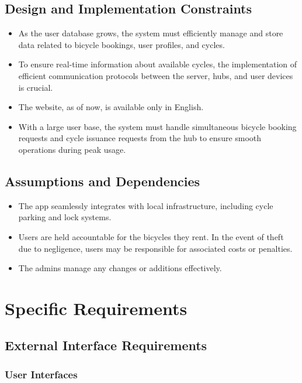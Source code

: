 \documentclass{scrreprt}
\begin{document}
\section{Design and Implementation Constraints}
\begin{itemize}
    \item As the user database grows, the system must efficiently manage and store data related to bicycle bookings, user profiles, and cycles.
    \item To ensure real-time information about available cycles, the implementation of efficient communication protocols between the server, hubs, and user devices is crucial.
    \item The website, as of now, is available only in English.
    \item With a large user base, the system must handle simultaneous bicycle booking requests and cycle issuance requests from the hub to ensure smooth operations during peak usage.

\end{itemize}

\section{Assumptions and Dependencies}
\begin{itemize}
    \item The app seamlessly integrates with local infrastructure, including cycle parking and lock systems.
    \item Users are held accountable for the bicycles they rent. In the event of theft due to negligence, users may be responsible for associated costs or penalties.
    \item The admins manage any changes or additions effectively.

\end{itemize}

\chapter{Specific Requirements}
\section{External Interface Requirements}
\subsection{User Interfaces}
\end{document}
